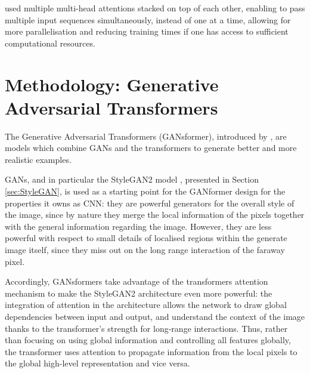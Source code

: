 \documentclass{article}
\begin{document}
	
	\citet{vaswani2017attention}used multiple multi-head attentions stacked on top of each other, 
	enabling to pass multiple input sequences simultaneously, instead of one at a time, allowing for 
	more parallelisation and reducing training times if one has access to sufficient computational 
	resources.
	
	\section{Methodology: Generative Adversarial Transformers}\label{sec:ganformer}
	
	The Generative Adversarial Transformers (GANsformer), introduced by 
	\citet{hudson2021generative}, are models which combine GANs and the transformers to 
	generate 
	better and more realistic examples.
	
	GANs, and in particular the StyleGAN2 model \cite{karras2020analyzing}, presented in Section 
	\ref{sec:StyleGAN}, %
	is used as a starting point for the 
	GANformer design for the properties it owns as CNN: they are powerful generators for the overall 
	style of the image, since by nature they merge the local information of the pixels together with the 
	general information regarding the image. 
	However, they are less powerful with respect to small details of localised regions within the 
	generate 
	image itself, since they miss out on the long range interaction of the faraway pixel.
	
	Accordingly, GANsformers take advantage of the transformers attention mechanism to make the 
	StyleGAN2 architecture even more powerful: the integration of attention in the architecture allows 
	the network to draw global dependencies between input and output, and understand the context of 
	the image thanks to the transformer's strength for long-range interactions.
	Thus, rather than focusing on using global information and controlling all features globally, 
	the transformer uses attention to propagate information from the local pixels to the global high-level 
	representation and vice versa. 
	
\end{document}
